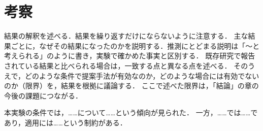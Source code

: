 \section{考察}
\label{sec:discussion}

\begin{writingnote}
結果の解釈を述べる．結果を繰り返すだけにならないように注意する．
主な結果ごとに，なぜその結果になったのかを説明する．推測にとどまる説明は「〜と考えられる」のように書き，実験で確かめた事実と区別する．
既存研究で報告されている結果と比べられる場合は，一致する点と異なる点を述べる．
そのうえで，どのような条件で提案手法が有効なのか，どのような場合には有効でないのか（限界）を，結果を根拠に議論する．
ここで述べた限界は，「結論」の章の今後の課題につながる．
\end{writingnote}

本実験の条件では，……について……という傾向が見られた．
一方，……では……であり，適用には……という制約がある．
